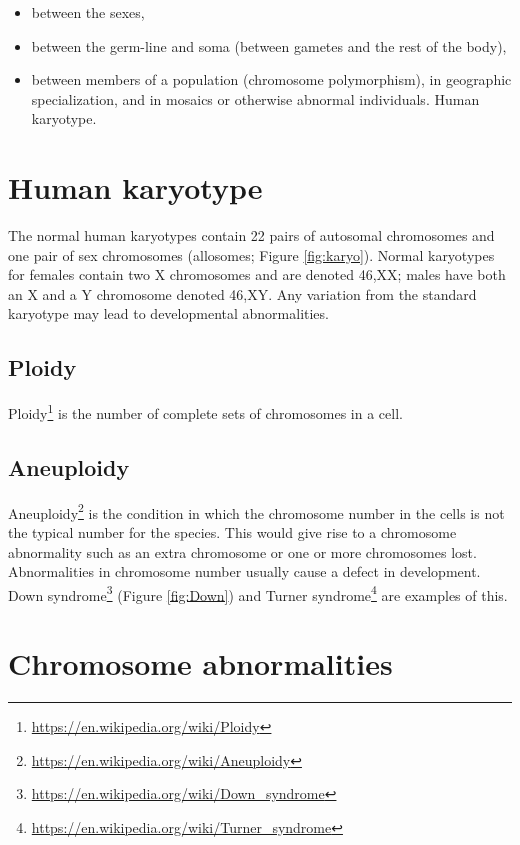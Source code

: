 \documentclass[]{book}
\providecommand{\tightlist}{%
  \setlength{\itemsep}{0pt}\setlength{\parskip}{0pt}}
\let\rmarkdownfootnote\footnote%
\def\footnote{\protect\rmarkdownfootnote}
\renewcommand{\href}[2]{#2\footnote{\url{#1}}}
\begin{document}
\begin{itemize}
\tightlist
\item
  between the sexes,
\item
  between the germ-line and soma (between gametes and the rest of the
  body),
\item
  between members of a population (chromosome polymorphism), in
  geographic specialization, and in mosaics or otherwise abnormal
  individuals. Human karyotype.
\end{itemize}

\section{Human karyotype}\label{human-karyotype}

The normal human karyotypes contain 22 pairs of autosomal chromosomes
and one pair of sex chromosomes (allosomes; Figure \ref{fig:karyo}).
Normal karyotypes for females contain two X chromosomes and are denoted
46,XX; males have both an X and a Y chromosome denoted 46,XY. Any
variation from the standard karyotype may lead to developmental
abnormalities.

\subsection{Ploidy}\label{ploidy}

\href{https://en.wikipedia.org/wiki/Ploidy}{Ploidy} is the number of
complete sets of chromosomes in a cell.

\subsection{Aneuploidy}\label{aneuploidy}

\href{https://en.wikipedia.org/wiki/Aneuploidy}{Aneuploidy} is the
condition in which the chromosome number in the cells is not the typical
number for the species. This would give rise to a chromosome abnormality
such as an extra chromosome or one or more chromosomes lost.
Abnormalities in chromosome number usually cause a defect in
development. \href{https://en.wikipedia.org/wiki/Down_syndrome}{Down
syndrome} (Figure \ref{fig:Down}) and
\href{https://en.wikipedia.org/wiki/Turner_syndrome}{Turner syndrome}
are examples of this.

\section{Chromosome abnormalities}\label{chromosome-abnormalities}
\end{document}
